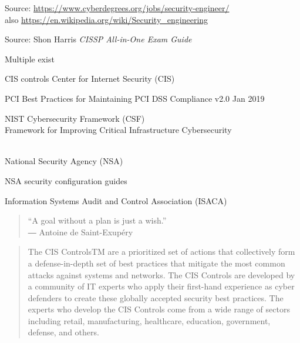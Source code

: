 \documentclass[Screen16to9,17pt]{foils}
\begin{document}
Source: \url{https://www.cyberdegrees.org/jobs/security-engineer/}\\
also
\url{https://en.wikipedia.org/wiki/Security_engineering}






Source: Shon Harris \emph{CISSP All-in-One Exam Guide}




\begin{list1}
\item Multiple exist
\vskip 1cm
\begin{list2}
\item CIS controls Center for Internet Security (CIS) 
\item PCI Best Practices for Maintaining PCI DSS Compliance v2.0 Jan 2019
\item NIST Cybersecurity Framework (CSF)\\
Framework for Improving
Critical Infrastructure Cybersecurity\\ \\
\item National Security Agency (NSA)\\ 
\item NSA security configuration guides\\ 
\item Information Systems Audit and Control Association (ISACA)\\
\end{list2}
\end{list1}


\begin{quote}
  “A goal without a plan is just a wish.”\\
  ― Antoine de Saint-Exupéry
\end{quote}

\begin{quote}
  The CIS ControlsTM are a prioritized set of actions that collectively form a defense-in-depth set
of best practices that mitigate the most common attacks against systems and networks. The
CIS Controls are developed by a community of IT experts who apply their first-hand experience
as cyber defenders to create these globally accepted security best practices. The experts who
develop the CIS Controls come from a wide range of sectors including retail, manufacturing,
healthcare, education, government, defense, and others.
\end{quote}
\end{document}
